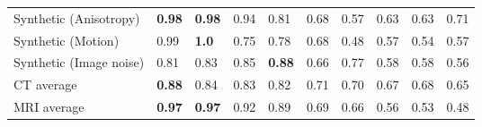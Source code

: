 \begin{table}[h]
{\begin{tabular}{llllllllll}
			Synthetic (Anisotropy)    &  \textbf{0.98}  &  \textbf{0.98}  &            0.94 &            0.81 &  0.68 &       0.57 &  0.63 &     0.63 &  0.71 \\
			Synthetic (Motion)        &           0.99 &  \textbf{1.0}  &            0.75 &            0.78 &  0.68 &       0.48 &  0.57 &     0.54 &  0.57 \\
			Synthetic (Image noise)   &            0.81 &            0.83 &            0.85 &  \textbf{0.88}  &  0.66 &       0.77 &  0.58 &     0.58 &  0.56 \\
			\midrule
			CT average                &  \textbf{0.88}  &            0.84 &            0.83 &            0.82 &  0.71 &       0.70 &  0.67 &     0.68 &  0.65 \\
			MRI average               &  \textbf{0.97}  &  \textbf{0.97}  &            0.92 &            0.89 &  0.69 &       0.66 &  0.56 &     0.53 &  0.48 \\
			\bottomrule
		\end{tabular}  
		
	}
	\label{tab:res_auroc}
\end{table}

